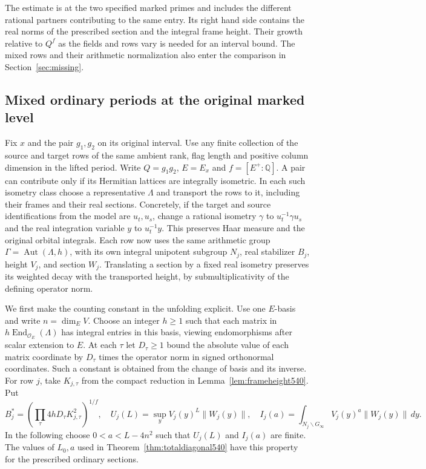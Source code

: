 \documentclass[a4paper,11pt]{article}
\theoremstyle{definition}
\theoremstyle{remark}
\numberwithin{equation}{section}
\begin{document}
The estimate is at the two specified marked primes and includes
the different rational partners contributing to the same entry.
Its right hand side contains the real norms of the prescribed
section and the integral frame height. Their growth relative to
\(Q^f\) as the fields and rows vary is needed for an interval
bound. The mixed rows and their arithmetic normalization also
enter the comparison in Section~\ref{sec:missing}.


\subsection{Mixed ordinary periods at the original marked level}
\label{sec:mixedordinary541}

Fix \(x\) and the pair \(g_1,g_2\) on its original interval.
Use any finite collection of the source and target rows of the
same ambient rank, flag length and positive column dimension
in the lifted period. Write \(Q=g_1g_2\), \(E=E_x\) and
\(f=[E^+:\mathbb Q]\). A pair can contribute only if its
Hermitian lattices are integrally isometric. In each such
isometry class choose a representative \(\Lambda\) and transport
the rows to it, including their frames and their real sections.
Concretely, if the target and source identifications from the
model are \(u_t,u_s\), change a rational isometry \(\gamma\) to
\(u_t^{-1}\gamma u_s\) and the real integration variable \(y\)
to \(u_t^{-1}y\). This preserves Haar measure and the original
orbital integrals. Each row now uses the same arithmetic group
\(\Gamma=\operatorname{Aut}(\Lambda,h)\), with its own integral
unipotent subgroup \(N_j\), real stabilizer \(B_j\), height
\(V_j\), and section \(W_j\). Translating a section by a fixed
real isometry preserves its weighted decay with the transported
height, by submultiplicativity of the defining operator norm.

We first make the counting constant in the unfolding explicit.
Use one \(E\)-basis and write \(n=\dim_E V\). Choose an integer
\(h\ge1\) such that each matrix in \(h\operatorname{End}_{\mathcal
O_E}(\Lambda)\) has integral entries in this basis, viewing
endomorphisms after scalar extension to \(E\). At each \(\tau\)
let \(D_\tau\ge1\) bound the absolute value of each matrix
coordinate by \(D_\tau\) times the operator norm in signed
orthonormal coordinates. Such a constant is obtained from the
change of basis and its inverse. For row \(j\), take \(K_{j,\tau}\)
from the compact reduction in Lemma~\ref{lem:frameheight540}.
Put
\[
 B_j^*=\left(\prod_\tau 4hD_\tau K_{j,\tau}^2\right)^{1/f},
 \quad U_j(L)=\sup_y V_j(y)^L\|W_j(y)\|,\quad
 I_j(a)=\int_{N_j\backslash G_\infty}V_j(y)^a\|W_j(y)\|\,dy .
\]
In the following choose \(0<a<L-4n^2\) such that \(U_j(L)\)
and \(I_j(a)\) are finite. The values of \(L_0,a\) used in
Theorem~\ref{thm:totaldiagonal540} have this property for
the prescribed ordinary sections.
\end{document}

